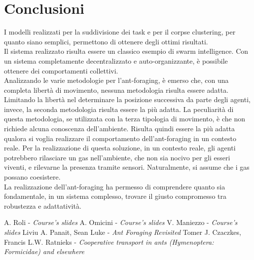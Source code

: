 \documentclass[12pt,a4paper,openright,twoside]{report}
\begin{document}
\clearpage{\pagestyle{empty}\cleardoublepage}
\chapter{Conclusioni}                %
\lhead[\fancyplain{}{\bfseries\thepage}]{\fancyplain{}{\bfseries\rightmark}}

I modelli realizzati per la suddivisione dei task e per il corpse clustering, per quanto siano semplici, permettono di ottenere degli ottimi risultati.\\
Il sistema realizzato risulta essere un classico esempio di swarm intelligence. Con un sistema completamente decentralizzato e auto-organizzante, è possibile ottenere dei comportamenti collettivi.\\
Analizzando le varie metodologie per l'ant-foraging, è emerso che, con una completa libertà di movimento, nessuna metodologia risulta essere adatta. Limitando la libertà nel determinare la posizione successiva da parte degli agenti, invece, la seconda metodologia risulta essere la più adatta. La peculiarità di questa metodologia, se utilizzata con la terza tipologia di movimento, è che non richiede alcuna conoscenza dell'ambiente. Risulta quindi essere la più adatta qualora si voglia realizzare il comportamento dell'ant-foraging in un contesto reale. Per la realizzazione di questa soluzione, in un contesto reale, gli agenti potrebbero rilasciare un gas nell'ambiente, che non sia nocivo per gli esseri viventi, e rilevarne la presenza tramite sensori. Naturalmente, si assume che i gas possano coesistere.\\
La realizzazione dell'ant-foraging ha permesso di comprendere quanto sia fondamentale, in un sistema complesso, trovare il giusto compromesso tra robustezza e adattatività.\\

	\clearpage{\pagestyle{empty}\cleardoublepage}
	\begin{thebibliography}{90}             %
		\rhead[\fancyplain{}{\bfseries \leftmark}]{\fancyplain{}{\bfseries
				\thepage}}
		 A. Roli - \textit{Course's slides}
		 A. Omicini - \textit{Course's slides}  
		 V. Maniezzo - \textit{Course's slides}  
		 Liviu A. Panait, Sean Luke - \textit{Ant Foraging Revisited}
		 Tomer J. Czaczkes, Francis L.W. Ratnieks - \textit{Cooperative transport in ants (Hymenoptera: Formicidae) and elsewhere}
	\end{thebibliography}
\end{document}
